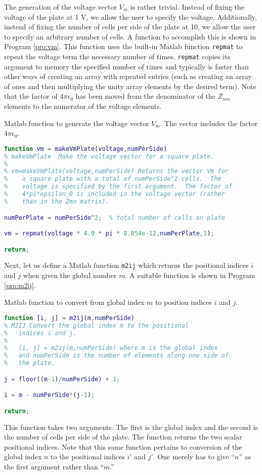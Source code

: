 The generation of the voltage vector $V_m$ is rather trivial. Instead
of fixing the voltage of the plate at 1 V, we allow the user to
specify the voltage.  Additionally, instead of fixing the number of
cells per side of the plate at 10, we allow the user to specify an
arbitrary number of cells.  A function to accomplish this is shown in
Program \ref{pro:vm}.  This function uses the built-in Matlab function
{\tt repmat} to repeat the voltage term the necessary number of times.
{\tt repmat} copies its argument to memory the specified number of
times and typically is faster than other ways of creating an array
with repeated entries (such as creating an array of ones and then
multiplying the unity array elements by the desired term).  Note that
the factor of $4\pi\epsilon_0$ has been moved from the denominator of
the $Z_{mn}$ elements to the numerator of the voltage elements.
\begin{program}
Matlab function to generate the voltage vector $V_m$.  The
vector includes the factor $4\pi\epsilon_0$. \label{pro:vm}
\codemiddle
\begin{lstlisting}[language=Matlab]
function vm = makeVmPlate(voltage,numPerSide)
% makeVmPlate  Make the voltage vector for a square plate.
%
% vm=makeVmPlate(voltage,numPerSide) Returns the vector Vm for
%    a square plate with a total of numPerSide^2 cells.  The
%    voltage is specified by the first argument.  The factor of
%    4*pi*epsilon_0 is included in the voltage vector (rather
%    than in the Zmn matrix).

numPerPlate = numPerSide^2;  % total number of cells on plate

vm = repmat(voltage * 4.0 * pi * 8.854e-12,numPerPlate,1);

return;
\end{lstlisting}
\end{program}

Next, let us define a Matlab function {\tt m2ij} which returns the
positional indices $i$ and $j$ when given the global number $m$.  A
suitable function is shown in Program \ref{pro:m2ij}.
\begin{program}
Matlab function to convert from global index $m$ to position
indices $i$ and $j$. \label{pro:m2ij}
\codemiddle
\begin{lstlisting}[language=Matlab]
function [i, j] = m2ij(m,numPerSide)
% M2IJ Convert the global index m to the positional
%   indices i and j.
%
%   [i, j] = m2ij(m,numPerSide) where m is the global index
%   and numPerSide is the number of elements along one side of
%   the plate.

j = floor((m-1)/numPerSide) + 1;

i = m - numPerSide*(j-1);

return;
\end{lstlisting}
\end{program}
This function takes two arguments.  The first is the global index and
the second is the number of cells per side of the plate.  The function
returns the two scalar positional indices.  Note that this same
function pertains to conversion of the global index $n$ to the
positional indices $i'$ and $j'$.  One merely has to give ``$n$'' as
the first argument rather than ``$m$.''

